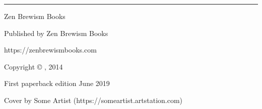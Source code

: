 \documentclass{novel}
\begin{document}
\frontmatter %
\thispagestyle{empty}
\hspace{0pt}
\vfill
\begin{center}
\charscale[4]{\theTitle}
\end{center}
\vfill
\hspace{0pt}
\clearpage

\thispagestyle{empty}
\null %
\clearpage

\thispagestyle{empty}

\thispagestyle{empty}
\hspace{0pt}
\vfill
\begin{center}
\begin{parascale}[4]{\theTitle}\end{parascale}
\vspace{2\nbs}
\begin{parascale}[2]{\theSubtitle}\end{parascale}
\vspace{2\nbs}
\rule{15em}{2pt}

\null

\vspace{3\nbs}

\begin{parascale}[3]{\theAuthor}\end{parascale}
\end{center}
\vfill
\begin{center}Zen Brewism Books\end{center}
\hspace{0pt}
\clearpage

\thispagestyle{empty}
\null
\vfill
\noindent Published by Zen Brewism Books

\noindent https://zenbrewismbooks.com

\null

\noindent Copyright © \theAuthor, 2014

\null

\noindent First paperback edition June 2019

\null

\noindent Cover by Some Artist (https://someartist.artstation.com)
\end{document}
